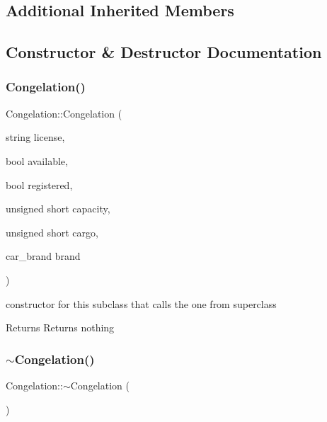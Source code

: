 \subsection*{Additional Inherited Members}


\subsection{Constructor \& Destructor Documentation}
\mbox{\label{class_congelation_a2c2b118a9550c2912b35fb85dd1594fb}} 
\subsubsection{\texorpdfstring{Congelation()}{Congelation()}}
{\footnotesize\ttfamily Congelation\+::\+Congelation (\begin{DoxyParamCaption}\item[{string}]{license,  }\item[{bool}]{available,  }\item[{bool}]{registered,  }\item[{unsigned short}]{capacity,  }\item[{unsigned short}]{cargo,  }\item[{car\+\_\+brand}]{brand }\end{DoxyParamCaption})}



constructor for this subclass that calls the one from superclass 

\begin{DoxyReturn}{Returns}
Returns nothing 
\end{DoxyReturn}
\mbox{\label{class_congelation_a7aa24e7127ec7c1d9d01043b665ae66f}} 
\subsubsection{\texorpdfstring{$\sim$\+Congelation()}{~Congelation()}}
{\footnotesize\ttfamily Congelation\+::$\sim$\+Congelation (\begin{DoxyParamCaption}{ }\end{DoxyParamCaption})\hspace{0.3cm}{\ttfamily [inline]}}



